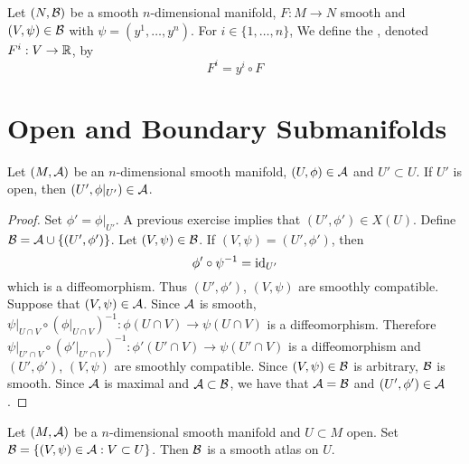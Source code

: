 \documentclass{book}
\begin{document}
	\begin{defn}
		Let $(N, \mathcal{B})$ be a smooth  $n$-dimensional manifold, $F: M \rightarrow N$ smooth and $(V, \psi) \in \mathcal{B}$ with $\psi = (y^1, \dots, y^n)$. For $i \in \{1, \dots, n\}$, We define the ,  denoted $F^i: V \rightarrow \mathbb{R}$, by $$F^i = y^i \circ F$$  
	\end{defn}

	






























\newpage
\section{Open and Boundary Submanifolds}

\begin{ex}
	Let $(M, \mathcal{A})$ be an $n$-dimensional smooth manifold, $(U, \phi) \in \mathcal{A}$ and $U' \subset U$. If $U'$ is open, then $(U', \phi|_{U'}) \in \mathcal{A}$. 
\end{ex}

\begin{proof}
	Set $\phi' = \phi|_{U'}$. A previous exercise implies that $(U', \phi') \in X(U)$. Define $\mathcal{B} = \mathcal{A} \cup \{(U', \phi')\}$. Let $(V, \psi) \in \mathcal{B}$. If $(V, \psi) = (U', \phi')$, then 
	$$\phi' \circ \psi^{-1} = \operatorname{id}_{U'}$$
	which is a diffeomorphism. Thus $(U', \phi')$, $(V, \psi)$ are smoothly compatible. Suppose that $(V, \psi) \in \mathcal{A}$. Since $\mathcal{A}$ is smooth, $\psi|_{U \cap V} \circ (\phi|_{U \cap V})^{-1}: \phi(U \cap V) \rightarrow \psi(U \cap V)$ is a diffeomorphism. Therefore $\psi|_{U' \cap V} \circ (\phi'|_{U' \cap V})^{-1}: \phi'(U' \cap V) \rightarrow \psi(U' \cap V)$ is a diffeomorphism and $(U', \phi')$, $(V, \psi)$ are smoothly compatible. Since $(V, \psi) \in \mathcal{B}$ is arbitrary, $\mathcal{B}$ is smooth. Since $\mathcal{A}$ is maximal and $\mathcal{A} \subset \mathcal{B}$, we have that $\mathcal{A} = \mathcal{B}$ and $(U', \phi') \in \mathcal{A}$.
\end{proof}

\begin{ex}
	Let $(M, \mathcal{A})$ be a $n$-dimensional smooth manifold and $U \subset M$ open. Set $\mathcal{B} = \{(V, \psi) \in \mathcal{A}: V \subset U\}$. Then $\mathcal{B}$ is a smooth atlas on $U$.
\end{ex}
\end{document}
